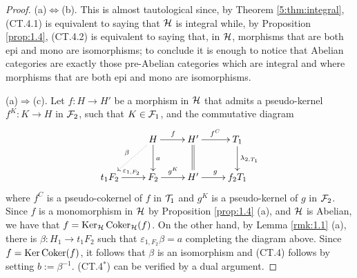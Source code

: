\begin{proof}
  (a)$\Leftrightarrow$(b). This is almost tautological since, by Theorem \ref{5:thm:integral}, (CT.4.1) is equivalent to saying that $\mathcal{H}$ is integral while, by Proposition \ref{prop:1.4}, (CT.4.2) is equivalent to saying that, in $\mathcal{H}$, morphisms that are both epi and mono are isomorphisms; to conclude it is enough to notice that Abelian categories are exactly those pre-Abelian categories which are integral and where morphisms that are both epi and mono are isomorphisms.


\smallskip\noindent
(a)$\Rightarrow$(c).
Let $f\colon H\to H'$ be a morphism in $\mathcal{H}$ that admits a pseudo-kernel $f^K\colon K\to H$ in $\mathcal{F}_2$, such that $K\in \mathcal{F}_1$, and the commutative diagram
\begin{equation*}
\xymatrix{
 & H\ar@{.>}[dl]_{\beta}\ar[d]^{a}\ar[r]^{f} & H'\ar@{=}[d]\ar[r]^{f^C} & T_1\ar[d]^{\lambda_{2,T_1}}\\
t_1F_2\ar[r]^{\varepsilon_{1,F_2}} & F_2\ar[r]^{g^K} & H'\ar[r]^{g} & f_2T_1
}
\end{equation*}
where $f^C$  is a pseudo-cokernel of $f$ in $\mathcal{T}_1$ and $g^K$ is a pseudo-kernel of $g$ in $\mathcal{F}_2$. Since $f$ is a monomorphism in $\mathcal{H}$ by Proposition \ref{prop:1.4} (a), and $\mathcal{H}$ is Abelian, we have that $f=\operatorname{Ker}_{\mathcal{H}} \operatorname{Coker}_{\mathcal{H}} (f)$. On the other hand, by Lemma \ref{rmk:1.1} (a), there is $\beta\colon H_1\to t_1F_2$ such that $\varepsilon_{1,F_2}\beta = a$ completing the diagram above. Since $f=\operatorname{Ker} \operatorname{Coker}(f)$, it follows that $\beta$ is an isomorphism and (CT.4) follows by setting $b:=\beta^{-1}$. (CT.4$^*$) can be verified by a dual argument.




\end{proof}
